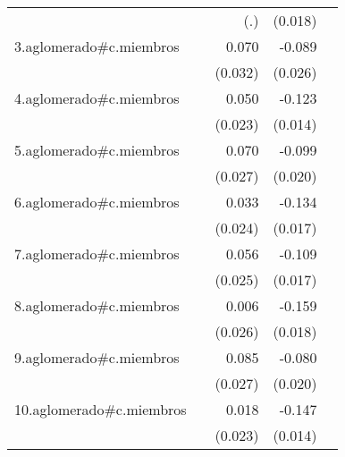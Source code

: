 {\begin{longtable}{l*{4}{D{.}{.}{-1}}}
            &                     &         (.)         &     (0.018)         &                     \\
\addlinespace
3.aglomerado#c.miembros&                     &       0.070\sym{*}  &      -0.089\sym{***}&                     \\
            &                     &     (0.032)         &     (0.026)         &                     \\
\addlinespace
4.aglomerado#c.miembros&                     &       0.050\sym{*}  &      -0.123\sym{***}&                     \\
            &                     &     (0.023)         &     (0.014)         &                     \\
\addlinespace
5.aglomerado#c.miembros&                     &       0.070\sym{*}  &      -0.099\sym{***}&                     \\
            &                     &     (0.027)         &     (0.020)         &                     \\
\addlinespace
6.aglomerado#c.miembros&                     &       0.033         &      -0.134\sym{***}&                     \\
            &                     &     (0.024)         &     (0.017)         &                     \\
\addlinespace
7.aglomerado#c.miembros&                     &       0.056\sym{*}  &      -0.109\sym{***}&                     \\
            &                     &     (0.025)         &     (0.017)         &                     \\
\addlinespace
8.aglomerado#c.miembros&                     &       0.006         &      -0.159\sym{***}&                     \\
            &                     &     (0.026)         &     (0.018)         &                     \\
\addlinespace
9.aglomerado#c.miembros&                     &       0.085\sym{**} &      -0.080\sym{***}&                     \\
            &                     &     (0.027)         &     (0.020)         &                     \\
\addlinespace
10.aglomerado#c.miembros&                     &       0.018         &      -0.147\sym{***}&                     \\
            &                     &     (0.023)         &     (0.014)         &                     \\

\end{longtable}}
